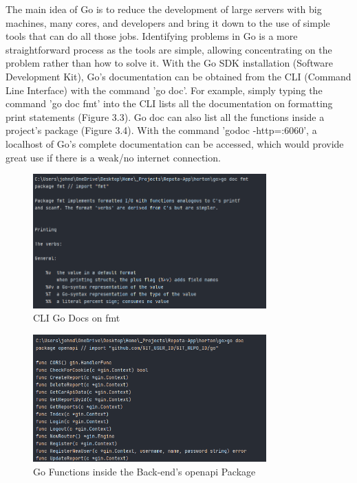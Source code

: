 The main idea of Go is to reduce the development of large servers with big machines, many cores, and developers and bring it down to the use of simple tools that can do all those jobs. \cite{ref10} Identifying problems in Go is a more straightforward process as the tools are simple, allowing concentrating on the problem rather than how to solve it. With the Go SDK installation (Software Development Kit), Go's documentation can be obtained from the CLI (Command Line Interface) with the command 'go doc'. For example, simply typing the command 'go doc fmt' into the CLI lists all the documentation on formatting print statements (Figure 3.3). Go doc can also list all the functions inside a project's package (Figure 3.4). With the command 'godoc -http=:6060', a localhost of Go's complete documentation can be accessed, which would provide great use if there is a weak/no internet connection.

\begin{figure}[H]
    \caption{CLI Go Docs on fmt}
    \label{image:goDocFmt}
    \centering
    \includegraphics[width=0.8\textwidth]{images/misc/go-doc-fmt.png}
\end{figure}

\begin{figure}[H]
    \caption{Go Functions inside the Back-end's openapi Package}
    \label{image:goFuncs}
    \centering
    \includegraphics[width=0.8\textwidth]{images/misc/godoc-funcs.png}
\end{figure}


